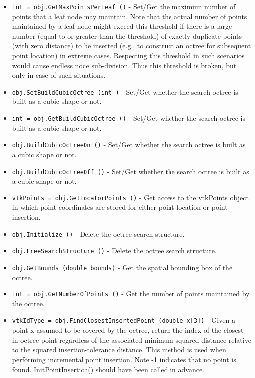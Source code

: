 \begin{itemize}
\item  \verb|int = obj.GetMaxPointsPerLeaf ()| -  Set/Get the maximum number of points that a leaf node may maintain.
 Note that the actual number of points maintained by a leaf node might
 exceed this threshold if there is a large number (equal to or greater
 than the threshold) of exactly duplicate points (with zero distance)
 to be inserted (e.g., to construct an octree for subsequent point 
 location) in extreme cases. Respecting this threshold in such scenarios
 would cause endless node sub-division. Thus this threshold is broken, but
 only in case of such situations.

\item  \verb|obj.SetBuildCubicOctree (int )| -  Set/Get whether the search octree is built as a cubic shape or not.

\item  \verb|int = obj.GetBuildCubicOctree ()| -  Set/Get whether the search octree is built as a cubic shape or not.

\item  \verb|obj.BuildCubicOctreeOn ()| -  Set/Get whether the search octree is built as a cubic shape or not.

\item  \verb|obj.BuildCubicOctreeOff ()| -  Set/Get whether the search octree is built as a cubic shape or not.

\item  \verb|vtkPoints = obj.GetLocatorPoints ()| -  Get access to the vtkPoints object in which point coordinates are stored
 for either point location or point insertion.

\item  \verb|obj.Initialize ()| -  Delete the octree search structure. 

\item  \verb|obj.FreeSearchStructure ()| -  Delete the octree search structure. 

\item  \verb|obj.GetBounds (double bounds)| -  Get the spatial bounding box of the octree.

\item  \verb|int = obj.GetNumberOfPoints ()| -  Get the number of points maintained by the octree.

\item  \verb|vtkIdType = obj.FindClosestInsertedPoint (double x[3])| -  Given a point x assumed to be covered by the octree, return the index of
 the closest in-octree point regardless of the associated minimum squared
 distance relative to the squared insertion-tolerance distance. This method
 is used when performing incremental point insertion. Note -1 indicates that
 no point is found. InitPointInsertion() should have been called in advance.


\end{itemize}
